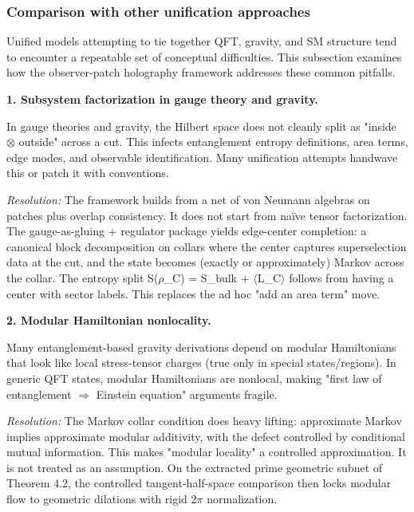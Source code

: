 \subsubsection{Comparison with other unification approaches}\label{85-comparison-with-other-unification-approaches}

Unified models attempting to tie together QFT, gravity, and SM structure tend to encounter a repeatable set of conceptual difficulties. This subsection examines how the observer-patch holography framework addresses these common pitfalls.

\textbf{1. Subsystem factorization in gauge theory and gravity.}

In gauge theories and gravity, the Hilbert space does not cleanly split as "inside \ensuremath{\otimes} outside" across a cut. This infects entanglement entropy definitions, area terms, edge modes, and observable identification. Many unification attempts handwave this or patch it with conventions.

\emph{Resolution:} The framework builds from a net of von Neumann algebras on patches plus overlap consistency. It does not start from na\"{i}ve tensor factorization. The gauge-as-gluing + regulator package yields edge-center completion: a canonical block decomposition on collars where the center captures superselection data at the cut, and the state becomes (exactly or approximately) Markov across the collar. The entropy split S(\ensuremath{\rho}\_C) = S\_bulk + \ensuremath{\langle}L\_C\ensuremath{\rangle} follows from having a center with sector labels. This replaces the ad hoc "add an area term" move.

\textbf{2. Modular Hamiltonian nonlocality.}

Many entanglement-based gravity derivations depend on modular Hamiltonians that look like local stress-tensor charges (true only in special states/regions). In generic QFT states, modular Hamiltonians are nonlocal, making "first law of entanglement \ensuremath{\Rightarrow} Einstein equation" arguments fragile.

\emph{Resolution:} The Markov collar condition does heavy lifting: approximate Markov implies approximate modular additivity, with the defect controlled by conditional mutual information. This makes "modular locality" a controlled approximation. It is not treated as an assumption. On the extracted prime geometric subnet of Theorem 4.2, the controlled tangent-half-space comparison then locks modular flow to geometric dilations with rigid \(2\pi\) normalization.

